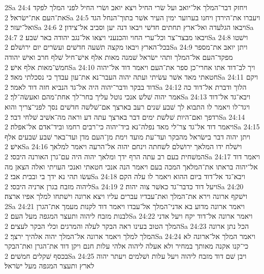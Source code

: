2Sa 24:4  ויחזק דבר־המלך אל־יואב ועל שׂרי החיל ויצא יואב ושׂרי החיל לפני המלך לפקד את־העם את־ישׂראל׃
2Sa 24:5  ויעברו את־הירדן ויחנו בערוער ימין העיר אשׁר בתוך־הנחל הגד ואל־יעזר׃
2Sa 24:6  ויבאו הגלעדה ואל־ארץ תחתים חדשׁי ויבאו דנה יען וסביב אל־צידון׃
2Sa 24:7  ויבאו מבצר־צר וכל־ערי החוי והכנעני ויצאו אל־נגב יהודה באר שׁבע׃
2Sa 24:8  וישׁטו בכל־הארץ ויבאו מקצה תשׁעה חדשׁים ועשׂרים יום ירושׁלם׃
2Sa 24:9  ויתן יואב את־מספר מפקד־העם אל־המלך ותהי ישׂראל שׁמנה מאות אלף אישׁ־חיל שׁלף חרב ואישׁ יהודה חמשׁ־מאות אלף אישׁ׃
2Sa 24:10  ויך לב־דוד אתו אחרי־כן ספר את־העם ויאמר דוד אל־יהוה חטאתי מאד אשׁר עשׂיתי ועתה יהוה העבר־נא את־עון עבדך כי נסכלתי מאד׃
2Sa 24:11  ויקם דוד בבקר ודבר־יהוה היה אל־גד הנביא חזה דוד לאמר׃
2Sa 24:12  הלוך ודברת אל־דוד כה אמר יהוה שׁלשׁ אנכי נוטל עליך בחר־לך אחת־מהם ואעשׂה־לך׃
2Sa 24:13  ויבא־גד אל־דוד ויגד־לו ויאמר לו התבוא לך שׁבע שׁנים רעב בארצך אם־שׁלשׁה חדשׁים נסך לפני־צריך והוא רדפך ואם־היות שׁלשׁת ימים דבר בארצך עתה דע וראה מה־אשׁיב שׁלחי דבר׃
2Sa 24:14  ויאמר דוד אל־גד צר־לי מאד נפלה־נא ביד־יהוה כי־רבים רחמו וביד־אדם אל־אפלה׃
2Sa 24:15  ויתן יהוה דבר בישׂראל מהבקר ועד־עת מועד וימת מן־העם מדן ועד־באר שׁבע שׁבעים אלף אישׁ׃
2Sa 24:16  וישׁלח ידו המלאך ירושׁלם לשׁחתה וינחם יהוה אל־הרעה ויאמר למלאך המשׁחית בעם רב עתה הרף ידך ומלאך יהוה היה עם־גרן האורנה היבסי׃
2Sa 24:17  ויאמר דוד אל־יהוה בראתו את־המלאך המכה בעם ויאמר הנה אנכי חטאתי ואנכי העויתי ואלה הצאן מה עשׂו תהי נא ידך בי ובבית אבי׃
2Sa 24:18  ויבא־גד אל־דוד ביום ההוא ויאמר לו עלה הקם ליהוה מזבח בגרן ארניה היבסי׃
2Sa 24:19  ויעל דוד כדבר־גד כאשׁר צוה יהוה׃
2Sa 24:20  וישׁקף ארונה וירא את־המלך ואת־עבדיו עברים עליו ויצא ארונה וישׁתחו למלך אפיו ארצה׃
2Sa 24:21  ויאמר ארונה מדוע בא אדני־המלך אל־עבדו ויאמר דוד לקנות מעמך את־הגרן לבנות מזבח ליהוה ותעצר המגפה מעל העם׃
2Sa 24:22  ויאמר ארונה אל־דוד יקח ויעל אדני המלך הטוב בעינו ראה הבקר לעלה והמרגים וכלי הבקר לעצים׃
2Sa 24:23  הכל נתן ארונה המלך למלך ויאמר ארונה אל־המלך יהוה אלהיך ירצך׃
2Sa 24:24  ויאמר המלך אל־ארונה לא כי־קנו אקנה מאותך במחיר ולא אעלה ליהוה אלהי עלות חנם ויקן דוד את־הגרן ואת־הבקר בכסף שׁקלים חמשׁים׃
2Sa 24:25  ויבן שׁם דוד מזבח ליהוה ויעל עלות ושׁלמים ויעתר יהוה לארץ ותעצר המגפה מעל ישׂראל׃


